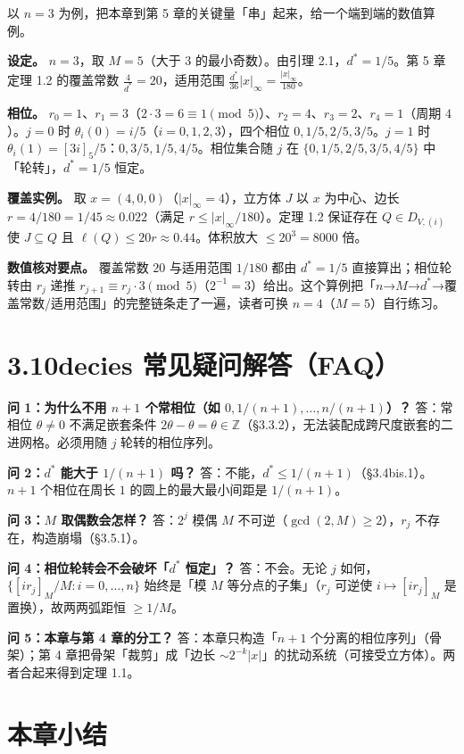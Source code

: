 \documentclass[a4paper,11pt,openany]{ctexbook}
\numberwithin{equation}{chapter}
\numberwithin{figure}{chapter}
\numberwithin{table}{chapter}
\begin{document}
以 $n=3$ 为例，把本章到第 5 章的关键量「串」起来，给一个端到端的数值算例。

\textbf{设定。} $n=3$，取 $M=5$（大于 $3$ 的最小奇数）。由引理 2.1，$d^*=1/5$。第 5 章定理 1.2 的覆盖常数 $\frac4{d^*}=20$，适用范围 $\frac{d^*}{36}|x|_\infty=\frac{|x|_\infty}{180}$。

\textbf{相位。} $r_0=1$、$r_1=3$（$2\cdot3=6\equiv1\pmod5$）、$r_2=4$、$r_3=2$、$r_4=1$（周期 $4$）。$j=0$ 时 $\theta_i(0)=i/5$（$i=0,1,2,3$），四个相位 $0,1/5,2/5,3/5$。$j=1$ 时 $\theta_i(1)=[3i]_5/5$：$0,3/5,1/5,4/5$。相位集合随 $j$ 在 $\{0,1/5,2/5,3/5,4/5\}$ 中「轮转」，$d^*=1/5$ 恒定。

\textbf{覆盖实例。} 取 $x=(4,0,0)$（$|x|_\infty=4$），立方体 $J$ 以 $x$ 为中心、边长 $r=4/180=1/45\approx0.022$（满足 $r\le|x|_\infty/180$）。定理 1.2 保证存在 $Q\in D_{V,(i)}$ 使 $J\subseteq Q$ 且 $\ell(Q)\le20r\approx0.44$。体积放大 $\le20^3=8000$ 倍。

\textbf{数值核对要点。} 覆盖常数 $20$ 与适用范围 $1/180$ 都由 $d^*=1/5$ 直接算出；相位轮转由 $r_j$ 递推 $r_{j+1}\equiv r_j\cdot3\pmod5$（$2^{-1}=3$）给出。这个算例把「$n$→$M$→$d^*$→覆盖常数/适用范围」的完整链条走了一遍，读者可换 $n=4$（$M=5$）自行练习。

\section{3.10decies 常见疑问解答（FAQ）}

\textbf{问 1：为什么不用 $n+1$ 个常相位（如 $0,1/(n+1),\dots,n/(n+1)$）？} 答：常相位 $\theta\neq0$ 不满足嵌套条件 $2\theta-\theta=\theta\in\mathbb Z$（§3.3.2），无法装配成跨尺度嵌套的二进网格。必须用随 $j$ 轮转的相位序列。

\textbf{问 2：$d^*$ 能大于 $1/(n+1)$ 吗？} 答：不能，$d^*\le1/(n+1)$（§3.4bis.1）。$n+1$ 个相位在周长 $1$ 的圆上的最大最小间距是 $1/(n+1)$。

\textbf{问 3：$M$ 取偶数会怎样？} 答：$2^j$ 模偶 $M$ 不可逆（$\gcd(2,M)\ge2$），$r_j$ 不存在，构造崩塌（§3.5.1）。

\textbf{问 4：相位轮转会不会破坏「$d^*$ 恒定」？} 答：不会。无论 $j$ 如何，$\{[ir_j]_M/M:i=0,\dots,n\}$ 始终是「模 $M$ 等分点的子集」（$r_j$ 可逆使 $i\mapsto[ir_j]_M$ 是置换），故两两弧距恒 $\ge1/M$。

\textbf{问 5：本章与第 4 章的分工？} 答：本章只构造「$n+1$ 个分离的相位序列」（骨架）；第 4 章把骨架「裁剪」成「边长 $\sim2^{-k}|x|$」的扰动系统（可接受立方体）。两者合起来得到定理 1.1。

\section{本章小结}
\end{document}

